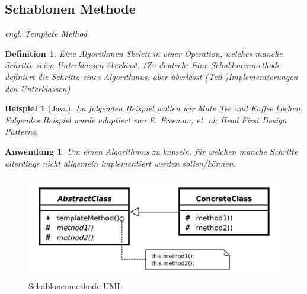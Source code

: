 \documentclass[a4paper]{article}
\theoremstyle{break}
\newtheorem{defi}{Definition}[section]
\newtheorem{ex}{Beispiel}[section]
\newtheorem{why}{Anwendung}[section]
\begin{document}
\newpage
\subsection{Schablonen Methode}

\textit{engl. Template Method}

\begin{defi}
	Eine Algorithmen Skelett in einer Operation, welches manche Schritte seien Unterklassen überlässt. (Zu deutsch: Eine Schablonenmethode definiert die Schritte eines Algorithmus, aber überlässt (Teil-)Implementierungen den Unterklassen)
\end{defi}

\begin{ex}[Java]
	Im folgenden Beispiel wollen wir Mate Tee und Kaffee kochen. Folgendes Beispiel wurde adaptiert von E. Freeman, et. al; Head First Design Patterns.
	
	
	
	
	
	
\end{ex}

\begin{why}
		Um einen Algorithmus zu kapseln, für welchen manche Schritte allerdings nicht allgemein implementiert werden sollen/können.	
\end{why}
\begin{figure}[ht]
	\centering
	\includegraphics[width=\textwidth]{../uml/TemplateMethodPattern.png}
	\caption{Schablonenmethode UML}
	\label{fig3}
\end{figure}
\end{document}
